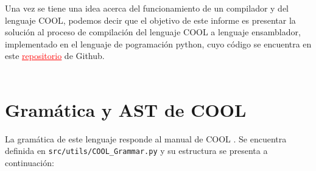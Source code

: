 \documentclass[twoside]{article}
\begin{document}
Una vez se tiene una idea acerca del funcionamiento de un compilador y del lenguaje COOL, podemos decir que el objetivo de este informe es presentar la soluci\'on al proceso de compilaci\'on del lenguaje COOL a lenguaje ensamblador, implementado en el lenguaje de pogramaci\'on python, cuyo c\'odigo se encuentra en este \href{https://github.com/BeginnerCompilers/cool-compiler-2021}{\textcolor{red}{\underline{repositorio}}} de Github.\\\\

\section{Gram\'atica y AST de COOL}
La gram\'atica de este lenguaje responde al manual de COOL \cite{cool}. Se encuentra definida en \texttt{src/utils/COOL\_Grammar.py} y su estructura se presenta a continuaci\'on:\\
\end{document}

